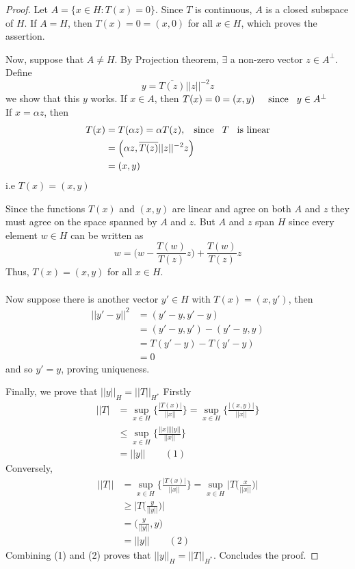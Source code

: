 \documentclass[11pt,a4paper]{article}
\theoremstyle{definition}
\begin{document}
\begin{proof}
Let $A=\{x\in H: T(x)=0\}$. Since $T$ is continuous, $A$ is a closed subspace of $H$.  If $A=H$, then $T(x)=0=(x,0)$ for all $x\in H$, which proves the assertion.

Now, suppose that $A\neq H$. By Projection theorem, $\exists$ a non-zero vector $z\in A^{\perp}$. Define $$y=\overline{T(z)}||z||^{-2}z$$ we show that this $y$ works. If $x\in A$, then \hspace{0.1cm}$T(x)=0=(x,y)\hspace{.5cm} \text{since}\hspace{0.3cm} y\in A^{\perp}$\\
If $x=\alpha z$, then
\begin{align*}
T(x) &=T(\alpha z)=\alpha T(z),\hspace{0.3cm} \text{since}\hspace{0.3cm} T\hspace{0.3cm} \text{is linear}\\
     &=\Big(\alpha z,\overline{T(z)}||z||^{-2}z\Big)\\
     &=(x,y)
\end{align*}
i.e $T(x)=(x,y)$

Since the functions $T(x)$ and $(x,y)$ are linear and agree on both $A$ and $z$ they must agree on the space spanned by $A$ and $z$. But $A$ and $z$ span $H$ since every element $w\in H$ can be written as $$w=\Bigg(w-\frac{T(w)}{T(z)}z\Bigg)+\frac{T(w)}{T(z)}z$$ Thus, $T(x)=(x,y)$ for all $x\in H$.\\\\
Now suppose there is another vector $y'\in H$ with $T(x)=(x,y')$, then
\begin{align*}
||y'-y||^2 &=(y'-y,y'-y)\\
           &=(y'-y,y')-(y'-y,y)\\
           &=T(y'-y)-T(y'-y)\\
           &=0
\end{align*}
and so $y'=y$, proving uniqueness.

Finally, we prove that $||y||_H=||T||_{H^*}$ Firstly
\begin{align*}
||T|  &=\sup_{x\in H}\Bigg\{\frac{|T(x)|}{||x||}\Bigg\}=\sup_{x\in H}\Bigg\{\frac{|(x,y)|}{||x||}\Bigg\}\\
      &\leq \sup_{x\in H}\Bigg\{\frac{||x||||y||}{||x||}\Bigg\}\\
      &=||y||\qquad (1)
\end{align*}
Conversely,
\begin{align*}
||T|| &=\sup_{x\in H}\Bigg\{\frac{|T(x)|}{||x||}\Bigg\}=\sup_{x\in H}\Bigg|T\Bigg(\frac{x}{||x||}\Bigg)\Bigg|\\
      &\geq \Bigg|T\Bigg(\frac{y}{||y||}\Bigg)\Bigg|\\
      &=\Bigg(\frac{y}{||y||},y\Bigg)\\
      &=||y||\qquad (2)
\end{align*}
Combining (1) and (2) proves that $||y||_H=||T||_{H^*}$. Concludes the proof.

\end{proof}
\end{document}
